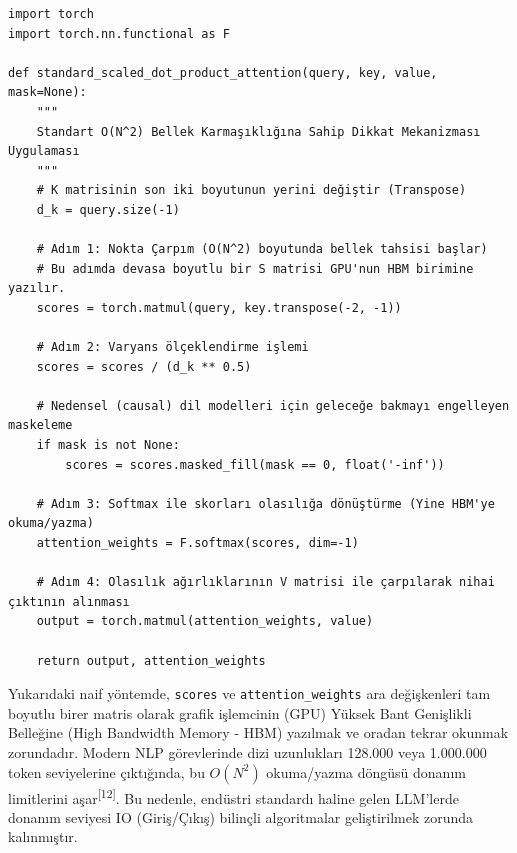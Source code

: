 \documentclass[11pt,a4paper]{article}
\begin{document}
\begin{Verbatim}[breaklines=true,breakanywhere=true,fontsize=\small]
import torch
import torch.nn.functional as F

def standard_scaled_dot_product_attention(query, key, value, mask=None):
    """
    Standart O(N^2) Bellek Karmaşıklığına Sahip Dikkat Mekanizması Uygulaması
    """
    # K matrisinin son iki boyutunun yerini değiştir (Transpose)
    d_k = query.size(-1)
    
    # Adım 1: Nokta Çarpım (O(N^2) boyutunda bellek tahsisi başlar)
    # Bu adımda devasa boyutlu bir S matrisi GPU'nun HBM birimine yazılır.
    scores = torch.matmul(query, key.transpose(-2, -1)) 
    
    # Adım 2: Varyans ölçeklendirme işlemi
    scores = scores / (d_k ** 0.5)
    
    # Nedensel (causal) dil modelleri için geleceğe bakmayı engelleyen maskeleme
    if mask is not None:
        scores = scores.masked_fill(mask == 0, float('-inf'))
        
    # Adım 3: Softmax ile skorları olasılığa dönüştürme (Yine HBM'ye okuma/yazma)
    attention_weights = F.softmax(scores, dim=-1)
    
    # Adım 4: Olasılık ağırlıklarının V matrisi ile çarpılarak nihai çıktının alınması
    output = torch.matmul(attention_weights, value)
    
    return output, attention_weights
\end{Verbatim}
Yukarıdaki naif yöntemde, \texttt{scores} ve \texttt{attention\_weights} ara değişkenleri tam boyutlu birer matris olarak grafik işlemcinin (GPU) Yüksek Bant Genişlikli Belleğine (High Bandwidth Memory - HBM) yazılmak ve oradan tekrar okunmak zorundadır. Modern NLP görevlerinde dizi uzunlukları 128.000 veya 1.000.000 token seviyelerine çıktığında, bu \(O(N^2)\) okuma/yazma döngüsü donanım limitlerini aşar\textsuperscript{[12]}. Bu nedenle, endüstri standardı haline gelen LLM'lerde donanım seviyesi IO (Giriş/Çıkış) bilinçli algoritmalar geliştirilmek zorunda kalınmıştır.
\end{document}

